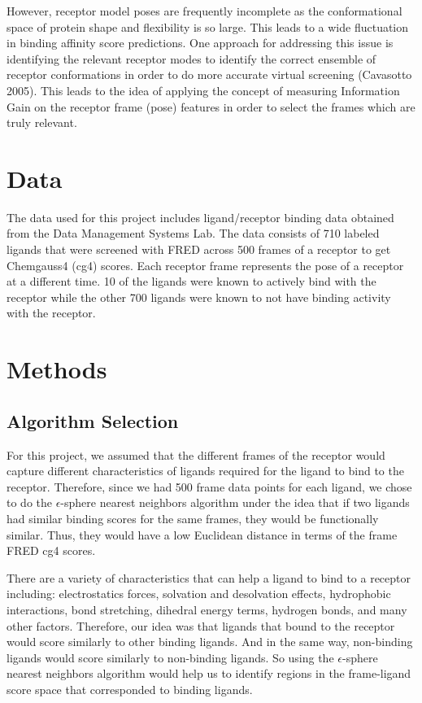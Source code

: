 \documentclass[11pt,letterpaper]{article}
\begin{document}
However, receptor model poses are frequently incomplete as the conformational space of protein shape and flexibility is so large.  This leads to a wide fluctuation in binding affinity score predictions.  One approach for addressing this issue is identifying the relevant receptor modes to identify the correct ensemble of receptor conformations in order to do more accurate virtual screening (Cavasotto 2005).  This leads to the idea of applying the concept of measuring Information Gain on the receptor frame (pose) features in order to select the frames which are truly relevant.

\section{Data}
The data used for this project includes ligand/receptor binding data obtained from the Data Management Systems Lab. The data consists of 710 labeled ligands that were screened with FRED across 500 frames of a receptor to get Chemgauss4 (cg4) scores. Each receptor frame represents the pose of a receptor at a different time.  10 of the ligands were known to actively bind with the receptor while the other 700 ligands were known to not have binding activity with the receptor.

\section{Methods}
\subsection{Algorithm Selection}
For this project, we assumed that the different frames of the receptor would capture different characteristics of ligands required for the ligand to bind to the receptor.  Therefore, since we had 500 frame data points for each ligand, we chose to do the $\epsilon$-sphere nearest neighbors algorithm under the idea that if two ligands had similar binding scores for the same frames, they would be functionally similar.  Thus, they would have a low Euclidean distance in terms of the frame FRED cg4 scores.

There are a variety of characteristics that can help a ligand to bind to a receptor including: electrostatics forces, solvation and desolvation effects, hydrophobic interactions, bond stretching, dihedral energy terms, hydrogen bonds, and many other factors.  Therefore, our idea was that ligands that bound to the receptor would score similarly to other binding ligands.  And in the same way, non-binding ligands would score similarly to non-binding ligands.  So using the $\epsilon$-sphere nearest neighbors algorithm would help us to identify regions in the frame-ligand score space that corresponded to binding ligands.
\end{document}
